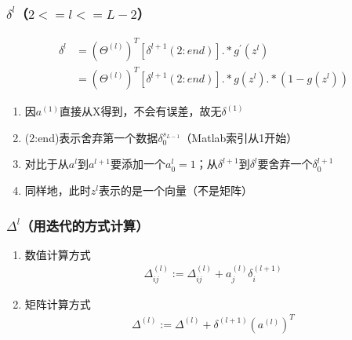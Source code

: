 

\subsubsection{$\delta^{l}$（$2<=l<=L-2$）}
\begin{equation}\begin{aligned}
	\delta^{l} &= (\Theta^{(l)})^T [\delta^{l+1}(2:end)] .* g^{'}(z^{l}) \\
	&= (\Theta^{(l)})^T [\delta^{l+1}(2:end)] .* g(z^{l}) .* (1-g(z^{l}))
\end{aligned}\end{equation}
\begin{enumerate}
	\item 因$a^{(1)}$直接从X得到，不会有误差，故无$\delta^{(1)}$
	\item (2:end)表示舍弃第一个数据$\delta_0^{s_{L-1}}$（Matlab索引从1开始）
	\item 对比于从$a^{l}$到$a^{l+1}$要添加一个$a_0^{l}=1$；从$\delta^{l+1}$到$\delta^{l}$要舍弃一个$\delta_0^{l+1}$
	\item 同样地，此时$z^{l}$表示的是一个向量（不是矩阵）
\end{enumerate}

\subsubsection{$\Delta^{l}$（用迭代的方式计算）}
\begin{enumerate}
	\item 数值计算方式
	\begin{equation}\begin{aligned}
		\Delta_{ij}^{(l)} := \Delta_{ij}^{(l)} + a_j^{(l)} \delta_i^{(l+1)}
	\end{aligned}\end{equation}
	\item 矩阵计算方式
	\begin{equation}\begin{aligned}
		\Delta^{(l)} := \Delta^{(l)} + \delta^{(l+1)} (a^{(l)})^T
	\end{aligned}\end{equation}
\end{enumerate}

